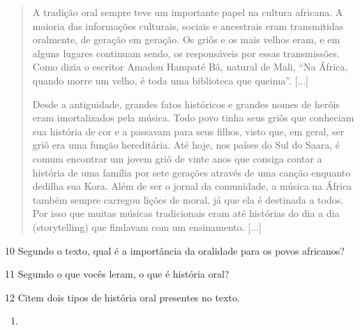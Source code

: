 \begin{itemize}
\begin{itemize}
\begin{itemize}
\begin{quote}
A tradição oral sempre teve um importante papel na cultura africana. A
maioria das informações culturais, sociais e ancestrais eram
transmitidas oralmente, de geração em geração. Os griôs e os mais
velhos eram, e em alguns lugares continuam sendo, os responsáveis por
essas transmissões. Como dizia o escritor Amadou Hampaté Bâ, natural de
Mali, ``Na África, quando morre um velho, é toda uma biblioteca que
queima''. [...]

Desde a antiguidade, grandes fatos históricos e grandes nomes de heróis
eram imortalizados pela música. Todo povo tinha seus griôs que conheciam
sua história de cor e a passavam para seus filhos, visto que, em geral,
ser griô era uma função hereditária. Até hoje, nos países do Sul do
Saara, é comum encontrar um jovem griô de vinte anos que consiga contar
a história de uma família por sete gerações através de uma canção
enquanto dedilha sua Kora. Além de ser o jornal da comunidade, a música
na África também sempre carregou lições de moral, já que ela é destinada
a todos. Por isso que muitas músicas tradicionais eram até histórias do
dia a dia (storytelling) que findavam com um ensinamento. [...]

\end{quote}

\num{10} Segundo o texto, qual é a importância da oralidade para os povos africanos?


\num{11} Segundo o que vocês leram, o que é história oral?


\num{12} Citem dois tipos de história oral presentes no texto.

\begin{enumerate}
\item \preencher {}


\end{enumerate}
\end{itemize}
\end{itemize}
\end{itemize}
